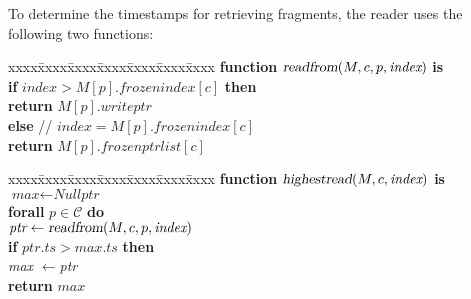\documentclass[oribibl]{llncs}
\theoremstyle{definition-boldhead}
\newcommand{\var}[1]{\textit{#1}}
\newcommand{\op}[1]{\textsl{#1}}
\newcommand{\becomes}{\ensuremath{\leftarrow}}
\newcommand{\clientset}{\ensuremath{\mathcal{C}}\xspace}
\begin{document}
To determine the timestamps for retrieving fragments, the reader
uses the following two functions:
\begin{minipage}{0.4\textwidth}
\begin{tabbing}\small
xxxx\=xxxx\=xxxx\=xxxx\=xxxx\=xxxx\=xxxx\kill
  \> \textbf{function} $\op{readfrom}(M, c, p, \var{index})$ \textbf{is} \\
  \> \> \textbf{if} $\var{index} > M[p].\var{frozenindex}[c]$ \textbf{then} \\
  \> \> \> \textbf{return} $M[p].\var{writeptr}$ \\
  \> \> \textbf{else} \quad // $\var{index} = M[p].\var{frozenindex}[c]$ \\
  \> \> \> \textbf{return} $M[p].\var{frozenptrlist}[c]$ \end{tabbing}
\end{minipage}
\begin{minipage}{0.4\textwidth}
\vspace{9mm}
\begin{tabbing}\small
xxxx\=xxxx\=xxxx\=xxxx\=xxxx\=xxxx\=xxxx\kill
  \> \textbf{function} $\op{highestread}(M, c, \var{index})$ \textbf{is} \\
  \> \> $\var{max} \becomes \var{Nullptr}$ \\
  \> \> \textbf{forall} $p \in \clientset$ \textbf{do} \\
  \> \> \> $\var{ptr} \becomes \op{readfrom}(M, c, p, \var{index})$ \\
  \> \> \> \textbf{if} $\var{ptr}.\var{ts} > \var{max}.\var{ts}$
              \textbf{then} \\
  \> \> \> \> \var{max} \becomes \var{ptr} \\
  \> \> \textbf{return} $\var{max}$
\end{tabbing}
\end{minipage}

\newpage
\end{document}
